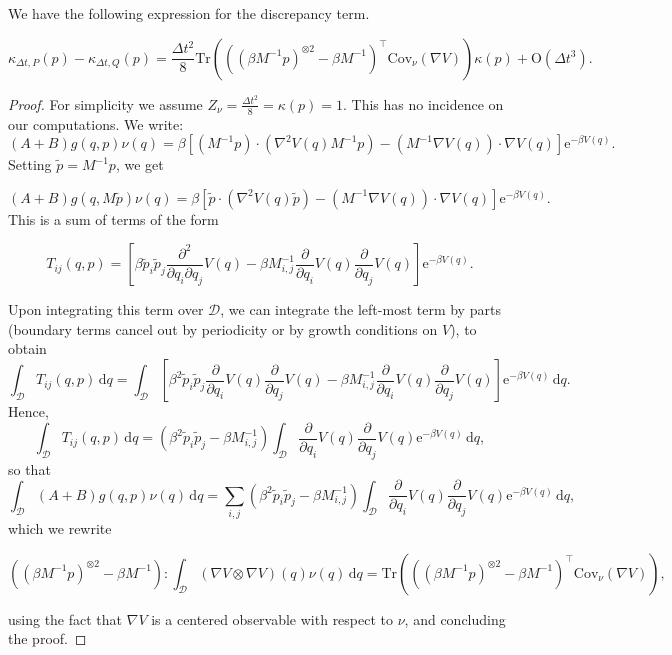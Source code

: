 \begin{prop}\label{prop discrepancy term}
  We have the following expression for the discrepancy term.

  \begin{equation}
    \label{discrepancy term}
    \kappa_{\Delta t,P}(p)- \kappa_{\Delta t,Q}(p)=\frac{\Delta t^2}8\mathrm{Tr}\left(\left(\left(\beta M^{-1}p\right)^{\otimes 2}-\beta M^{-1}\right)^\intercal\mathrm{Cov}_\nu(\nabla V)\right)\kappa(p) +\mathrm{O}(\Delta t^3).
  \end{equation}
\end{prop}
\begin{proof}
  For simplicity we assume $Z_\nu=\frac{\Delta t^2}8=\kappa(p)=1$. This has no incidence on our computations. We write:
  \begin{equation}
    (A+B)g(q,p)\nu(q)=\beta\left[\left(M^{-1}p\right)\cdot \left(\nabla^2V(q)M^{-1}p\right)-\left(M^{-1}\nabla V(q)\right)\cdot \nabla V(q)\right]\mathrm e^{-\beta V(q)}.
  \end{equation}
Setting $\tilde p= M^{-1}p$, we get 

\begin{equation}
  (A+B)g(q,M\tilde p)\nu(q)=\beta\left[\tilde p\cdot \left(\nabla^2V(q)\tilde p\right)-\left(M^{-1}\nabla V(q)\right)\cdot \nabla V(q)\right]\mathrm e^{-\beta V(q)}.
\end{equation}
This is a sum of terms of the form

$$T_{ij}(q,p)=\left[\beta \tilde p_i \tilde p_j \frac{\partial^2}{\partial q_i\partial q_j}V(q) - \beta M^{-1}_{i,j}\frac{\partial}{\partial q_i}V(q)\frac{\partial}{\partial q_j}V(q)\right]\mathrm e^{-\beta V(q)}.$$

Upon integrating this term over $\mathcal D$, we can integrate the left-most term by parts (boundary terms cancel out by periodicity or by growth conditions on $V$), to obtain
$$\int_{\mathcal D}T_{ij}(q,p)\,\mathrm{d}q=\int_{\mathcal D}\left[\beta^2\tilde p_i\tilde p_j \frac{\partial}{\partial q_i}V(q)\frac{\partial}{\partial q_j}V(q)-\beta M^{-1}_{i,j}\frac{\partial}{\partial q_i}V(q)\frac{\partial}{\partial q_j}V(q)\right]\mathrm e^{-\beta V(q)}\,\mathrm{d}q.$$
Hence,
$$\int_{\mathcal D}T_{ij}(q,p)\,\mathrm{d}q=\left(\beta^2\tilde p_i\tilde p_j -\beta M^{-1}_{i,j}\right)\int_{\mathcal D}\frac{\partial}{\partial q_i}V(q)\frac{\partial}{\partial q_j}V(q)\mathrm e^{-\beta V(q)}\,\mathrm{d}q,$$
so that
$$\int_{\mathcal D}(A+B)g(q,p)\nu(q)\,\mathrm{d}q=\sum_{i,j}\left(\beta^2\tilde p_i\tilde p_j -\beta M^{-1}_{i,j}\right)\int_{\mathcal D}\frac{\partial}{\partial q_i}V(q)\frac{\partial}{\partial q_j}V(q)\mathrm e^{-\beta V(q)}\,\mathrm{d}q,$$
which we rewrite

\begin{equation}
\left( \left(\beta M^{-1}p\right)^{\otimes 2}-\beta M^{-1}\right) : \int_{\mathcal D} \left(\nabla V \otimes \nabla V\right) (q) \nu(q)\,\mathrm{d}q=\mathrm{Tr}\left(\left(\left(\beta M^{-1}p\right)^{\otimes 2}-\beta M^{-1}\right)^\intercal\mathrm{Cov}_\nu(\nabla V)\right),
\end{equation}

using the fact that $\nabla V$ is a centered observable with respect to $\nu$, and concluding the proof.
\end{proof}

